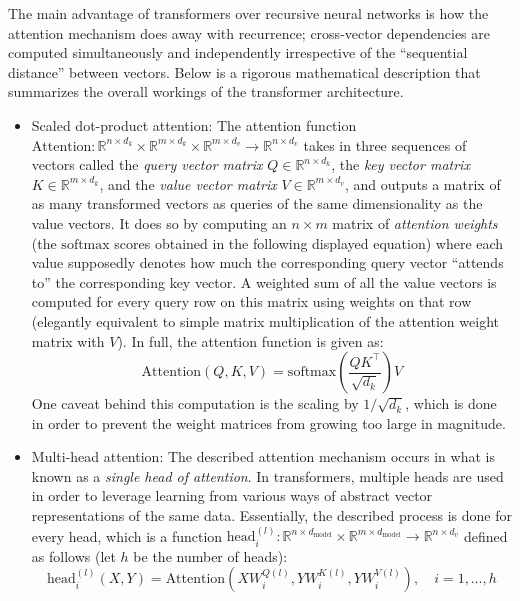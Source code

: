 \documentclass[stu,floatsintext]{apa7}
\begin{document}
The main advantage of transformers over recursive neural networks is how the attention mechanism does away with recurrence; cross-vector dependencies are computed simultaneously and independently irrespective of the ``sequential distance'' between vectors. Below is a rigorous mathematical description that summarizes the overall workings of the transformer architecture.
\begin{itemize}
\item Scaled dot-product attention: The attention function $\text{Attention}:\mathbb R^{n\times d_k}\times\mathbb R^{m\times d_k}\times\mathbb R^{m\times d_v}\to\mathbb R^{n\times d_v}$ takes in three sequences of vectors called the \textit{query vector matrix} $Q\in\mathbb R^{n\times d_k}$, the \textit{key vector matrix} $K\in\mathbb R^{m\times d_k}$, and the \textit{value vector matrix} $V\in\mathbb R^{m\times d_v}$, and outputs a matrix of as many transformed vectors as queries of the same dimensionality as the value vectors. It does so by computing an $n\times m$ matrix of \textit{attention weights} (the $\text{softmax}$ scores obtained in the following displayed equation) where each value supposedly denotes how much the corresponding query vector ``attends to'' the corresponding key vector. A weighted sum of all the value vectors is computed for every query row on this matrix using weights on that row (elegantly equivalent to simple matrix multiplication of the attention weight matrix with $V$). In full, the attention function is given as:
\begin{equation}\text{Attention}(Q, K, V) = \text{softmax}\left(\frac{QK^{\top}}{\sqrt{d_k}}\right)V\end{equation}
One caveat behind this computation is the scaling by $1/\sqrt{d_k}$, which is done in order to prevent the weight matrices from growing too large in magnitude.
\item Multi-head attention: The described attention mechanism occurs in what is known as a \textit{single head of attention}. In transformers, multiple heads are used in order to leverage learning from various ways of abstract vector representations of the same data. Essentially, the described process is done for every head, which is a function $\text{head}_i^{(l)}:\mathbb R^{n\times d_{\text{model}}}\times\mathbb R^{m\times d_{\text{model}}}\to\mathbb R^{n\times d_v}$ defined as follows (let $h$ be the number of heads):
\begin{equation}\text{head}_i^{(l)}(X,Y) = \text{Attention}\left(XW_i^{Q(l)}, YW_i^{K(l)}, YW_i^{V(l)}\right), \quad i = 1, \dots, h\end{equation}

\end{itemize}
\end{document}
